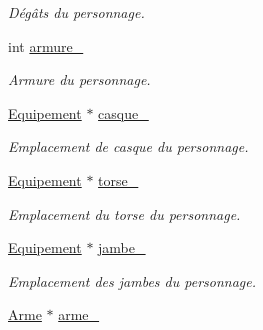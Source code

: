 \begin{DoxyCompactItemize}
\begin{DoxyCompactList}\small\item\em Dégâts du personnage. \end{DoxyCompactList}\item 
\hypertarget{class_personnage_adc9faad1d30de099542f716096a32a3b}{int \hyperlink{class_personnage_adc9faad1d30de099542f716096a32a3b}{armure\-\_\-}}\label{class_personnage_adc9faad1d30de099542f716096a32a3b}

\begin{DoxyCompactList}\small\item\em Armure du personnage. \end{DoxyCompactList}\item 
\hypertarget{class_personnage_a605a9b8a91b42ceb77632446cb1d24a1}{\hyperlink{class_equipement}{Equipement} $\ast$ \hyperlink{class_personnage_a605a9b8a91b42ceb77632446cb1d24a1}{casque\-\_\-}}\label{class_personnage_a605a9b8a91b42ceb77632446cb1d24a1}

\begin{DoxyCompactList}\small\item\em Emplacement de casque du personnage. \end{DoxyCompactList}\item 
\hypertarget{class_personnage_a1f149feed4bebb34eef01785a5528b67}{\hyperlink{class_equipement}{Equipement} $\ast$ \hyperlink{class_personnage_a1f149feed4bebb34eef01785a5528b67}{torse\-\_\-}}\label{class_personnage_a1f149feed4bebb34eef01785a5528b67}

\begin{DoxyCompactList}\small\item\em Emplacement du torse du personnage. \end{DoxyCompactList}\item 
\hypertarget{class_personnage_ab0c4cf4c9854ea6537cef5d1bf22aa19}{\hyperlink{class_equipement}{Equipement} $\ast$ \hyperlink{class_personnage_ab0c4cf4c9854ea6537cef5d1bf22aa19}{jambe\-\_\-}}\label{class_personnage_ab0c4cf4c9854ea6537cef5d1bf22aa19}

\begin{DoxyCompactList}\small\item\em Emplacement des jambes du personnage. \end{DoxyCompactList}\item 
\hypertarget{class_personnage_a533d049b89eea9c730cb5baeebf3d1ae}{\hyperlink{class_arme}{Arme} $\ast$ \hyperlink{class_personnage_a533d049b89eea9c730cb5baeebf3d1ae}{arme\-\_\-}}\label{class_personnage_a533d049b89eea9c730cb5baeebf3d1ae}


\end{DoxyCompactItemize}
